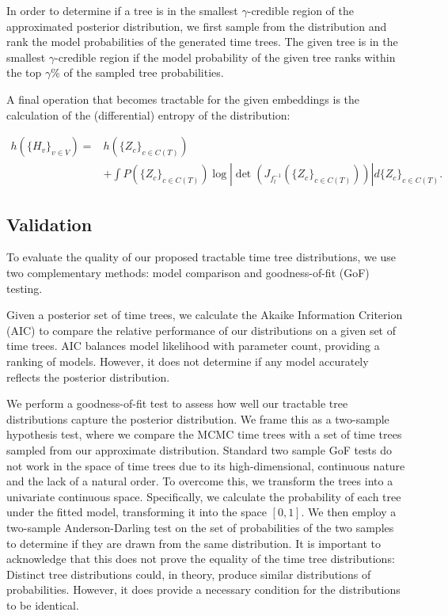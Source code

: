 \documentclass[10pt,letterpaper]{article}
\begin{document}
In order to determine if a tree is in the smallest $\gamma$-credible region of the approximated posterior distribution, we first sample from the distribution and rank the model probabilities of the generated time trees. The given tree is in the smallest $\gamma$-credible region if the model probability of the given tree ranks within the top $\gamma$\% of the sampled tree probabilities.

A final operation that becomes tractable for the given embeddings is the calculation of the (differential) entropy of the distribution:

\begin{equation*}
	\begin{split}
		h(\{H_v\}_{v \in V}) = &h(\{Z_c\}_{c \in C(T)}) \\
		& + \int P(\{Z_c\}_{c \in C(T)}) \log \left| \det{\left(J_{f_t^{-1}}(\{Z_c\}_{c \in C(T)})\right)} \right| d \{Z_c\}_{c \in C(T)}.
	\end{split}
\end{equation*}

\subsection*{Validation}

To evaluate the quality of our proposed tractable time tree distributions, we use two complementary methods: model comparison and goodness-of-fit (GoF) testing.

Given a posterior set of time trees, we calculate the Akaike Information Criterion (AIC) to compare the relative performance of our distributions on a given set of time trees. AIC balances model likelihood with parameter count, providing a ranking of models. However, it does not determine if any model accurately reflects the posterior distribution.

We perform a goodness-of-fit test to assess how well our tractable tree distributions capture the posterior distribution. We frame this as a two-sample hypothesis test, where we compare the MCMC time trees with a set of time trees sampled from our approximate distribution. Standard two sample GoF tests do not work in the space of time trees due to its high-dimensional, continuous nature and the lack of a natural order. To overcome this, we transform the trees into a univariate continuous space. Specifically, we calculate the probability of each tree under the fitted model, transforming it into the space $[0, 1]$. We then employ a two-sample Anderson-Darling test on the set of probabilities of the two samples to determine if they are drawn from the same distribution. It is important to acknowledge that this does not prove the equality of the time tree distributions: Distinct tree distributions could, in theory, produce similar distributions of probabilities. However, it does provide a necessary condition for the distributions to be identical.
\end{document}
